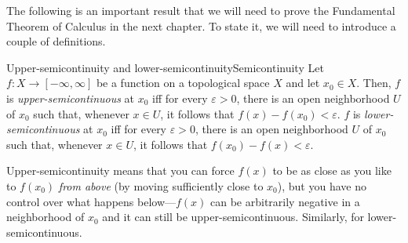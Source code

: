 The following is an important result that we will need to prove the Fundamental Theorem of Calculus in the next chapter.  To state it, we will need to introduce a couple of definitions.
\begin{dfn}{Upper-semicontinuity and lower-semicont\-inuity}{Semicontinuity}
Let $f\colon X\rightarrow [-\infty ,\infty ]$ be a function on a topological space $X$ and let $x_0\in X$.  Then, $f$ is \emph{upper-semicontinuous} at $x_0$ iff for every $\varepsilon >0$, there is an open neighborhood $U$ of $x_0$ such that, whenever $x\in U$, it follows that $f(x)-f(x_0)<\varepsilon$.  $f$ is \emph{lower-semicontinuous} at $x_0$ iff for every $\varepsilon >0$, there is an open neighborhood $U$ of $x_0$ such that, whenever $x\in U$, it follows that $f(x_0)-f(x)<\varepsilon $.
\begin{rmk}
Upper-semicontinuity means that you can force $f(x)$ to be as close as you like to $f(x_0)$ \emph{from above} (by moving sufficiently close to $x_0$), but you have no control over what happens below---$f(x)$ can be arbitrarily negative in a neighborhood of $x_0$ and it can still be upper-semicontinuous.  Similarly, for lower-semicontinuous.
\end{rmk}
\end{dfn}
